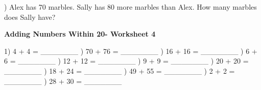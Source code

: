 \documentclass{article}%
\begin{document}
\newline%
\newline%
) Alex has 70 marbles. Sally has 80 more marbles than Alex. How many marbles does Sally have?%
\newline%
\newline%
\newline%
\pagebreak%
\large%
\begin{center}%
\textbf{Adding Numbers Within 20- Worksheet 4}%
\newline%
\newline%
\newline%
\end{center} \normalsize%
1) 4 + 4 = \_\_\_\_\_\_\_%
\newline%
\newline%
) 70 + 76 = \_\_\_\_\_\_\_%
\newline%
\newline%
) 16 + 16 = \_\_\_\_\_\_\_%
\newline%
\newline%
) 6 + 6 = \_\_\_\_\_\_\_%
\newline%
\newline%
) 12 + 12 = \_\_\_\_\_\_\_%
\newline%
\newline%
) 9 + 9 = \_\_\_\_\_\_\_%
\newline%
\newline%
) 20 + 20 = \_\_\_\_\_\_\_%
\newline%
\newline%
) 18 + 24 = \_\_\_\_\_\_\_%
\newline%
\newline%
) 49 + 55 = \_\_\_\_\_\_\_%
\newline%
\newline%
) 2 + 2 = \_\_\_\_\_\_\_%
\newline%
\newline%
) 28 + 30 = \_\_\_\_\_\_\_%
\newline%
\end{document}
